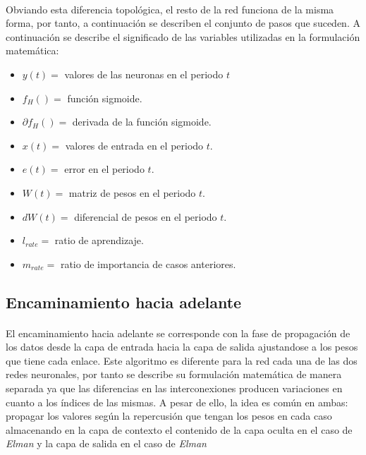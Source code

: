 \documentclass[10pt, a4paper,spanish]{article}
\begin{document}
		\paragraph{}
		Obviando esta diferencia topológica, el resto de la red funciona de la misma forma, por tanto, a continuación se describen el conjunto de pasos que suceden. A continuación se describe el significado de las variables utilizadas en la formulación matemática:

		\begin{itemize}
			\item $y(t) = $ valores de las neuronas en el periodo $t$
			\item $f_H() =$ función sigmoide.
			\item $\partial f_H() =$ derivada de la función sigmoide.
			\item $x(t) =$ valores de entrada en el periodo $t$.
			\item $e(t) =$ error en el periodo $t$.
			\item $W(t) =$ matriz de pesos en el periodo $t$.
			\item $dW(t) =$ diferencial de pesos en el periodo $t$.
			\item $l_{rate} =$ ratio de aprendizaje.
			\item $m_{rate} =$ ratio de importancia de casos anteriores.
		\end{itemize}


		\subsection{Encaminamiento hacia adelante}

			\paragraph{}
			El encaminamiento hacia adelante se corresponde con la fase de propagación de los datos desde la capa de entrada hacia la capa de salida ajustandose a los pesos que tiene cada enlace. Este algoritmo es diferente para la red cada una de las dos redes neuronales, por tanto se describe su formulación matemática de manera separada ya que las diferencias en las interconexiones producen variaciones en cuanto a los índices de las mismas. A pesar de ello, la idea es común en ambas: propagar los valores según la repercusión que tengan los pesos en cada caso almacenando en la capa de contexto el contenido de la capa oculta en el caso de \emph{Elman} y la capa de salida en el caso de \emph{Elman}
\end{document}
